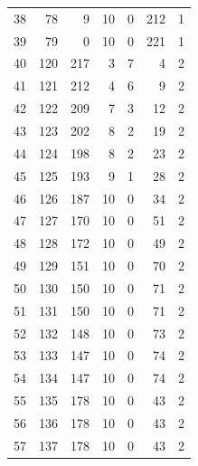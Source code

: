 \documentclass[a4paper,twoside,12pt]{book}
\begin{document}
\begin{appendices}
\begin{table}
\begin{tabular}{lrrrrrr}
		38  &     78 &         9 &        10 &               0 &             212 &         1 \\
		39  &     79 &         0 &        10 &               0 &             221 &         1 \\
		40  &    120 &       217 &         3 &               7 &               4 &         2 \\
		41  &    121 &       212 &         4 &               6 &               9 &         2 \\
		42  &    122 &       209 &         7 &               3 &              12 &         2 \\
		43  &    123 &       202 &         8 &               2 &              19 &         2 \\
		44  &    124 &       198 &         8 &               2 &              23 &         2 \\
		45  &    125 &       193 &         9 &               1 &              28 &         2 \\
		46  &    126 &       187 &        10 &               0 &              34 &         2 \\
		47  &    127 &       170 &        10 &               0 &              51 &         2 \\
		48  &    128 &       172 &        10 &               0 &              49 &         2 \\
		49  &    129 &       151 &        10 &               0 &              70 &         2 \\
		50  &    130 &       150 &        10 &               0 &              71 &         2 \\
		51  &    131 &       150 &        10 &               0 &              71 &         2 \\
		52  &    132 &       148 &        10 &               0 &              73 &         2 \\
		53  &    133 &       147 &        10 &               0 &              74 &         2 \\
		54  &    134 &       147 &        10 &               0 &              74 &         2 \\
		55  &    135 &       178 &        10 &               0 &              43 &         2 \\
		56  &    136 &       178 &        10 &               0 &              43 &         2 \\
		57  &    137 &       178 &        10 &               0 &              43 &         2 \\

\end{tabular}
\end{table}
\end{appendices}
\end{document}
